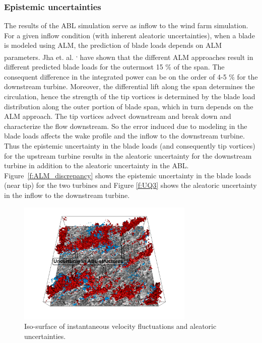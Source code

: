 \documentclass[]{aiaa-tc}%
\begin{document}
\subsubsection{Epistemic uncertainties}

The results of the ABL simulation serve as inflow to the wind farm simulation. For a given inflow condition (with inherent aleatoric uncertainties), when a blade is modeled using ALM, the prediction of blade loads depends on ALM parameters. Jha et. al. \cite{jha:aiaa2014}\textsuperscript{, }\cite{jha:jsee2014} have shown that the different ALM approaches result in different predicted blade loads for the outermost 15 \% of the span. The consequent difference in the integrated power can be on the order of 4-5 \% for the downstream turbine. Moreover, the differential lift along the span determines the circulation, hence the strength of the tip vortices is determined by the blade load distribution along the outer portion of blade span, which in turn depends on the ALM approach. The tip vortices advect downstream and break down and characterize the flow downstream. So the error induced due to modeling in the blade loads affects the wake profile and the inflow to the downstream turbine. Thus the epistemic uncertainty in the blade loads (and consequently tip vortices) for the upstream turbine results in the aleatoric uncertainty for the downstream turbine in addition to the aleatoric uncertainty in the ABL. Figure~\ref{f:ALM_discrepancy} shows the epistemic uncertainty in the blade loads (near tip) for the two turbines and Figure \ref{f:UQ3} shows the aleatoric uncertainty in the inflow to the downstream turbine.

\begin{figure}
\centering
 \includegraphics[width=0.75\textwidth]{UQ1.png}
 \caption{Iso-surface of instantaneous velocity fluctuations and aleatoric uncertainties.}
 \label{f:UQ1}
\end{figure}
\end{document}
